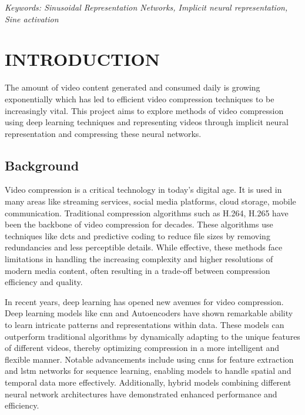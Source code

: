 \documentclass{ioereport}
\begin{document}
    \textit{Keywords: Sinusoidal Representation Networks, Implicit neural representation, Sine activation}

    \pagebreak
    
    \tableofcontents
    \pagebreak
    
    \listoffigures
    \pagebreak
    
    \listoftables
    \pagebreak

    \doublespacing
    \printglossary[type=\acronymtype,style=acronyms-only,title=List of Abbreviations{\vspace{0.15\baselineskip}}]
    \onehalfspacing


\mainsection

\section{\MakeUppercase{Introduction}}
The amount of video content generated and consumed daily is growing exponentially \cite{biteable2021} which has led to efficient video compression techniques to be increasingly vital. This project aims to explore methods of video compression using deep learning techniques and representing videos through implicit neural representation and compressing these neural networks.
    
    \subsection{Background}
    Video compression is a critical technology in today’s digital age. It is used in many areas like streaming services, social media platforms, cloud storage, mobile communication. Traditional compression algorithms such as H.264, H.265 have been the backbone of video compression for decades. These algorithms use techniques like \gls{dct}s and predictive coding to reduce file sizes by removing redundancies and less perceptible details. While effective, these methods face limitations in handling the increasing complexity and higher resolutions of modern media content, often resulting in a trade-off between compression efficiency and quality.

    In recent years, deep learning has opened new avenues for video compression. Deep learning models like \gls{cnn} and Autoencoders have shown remarkable ability to learn intricate patterns and representations within data. These models can outperform traditional algorithms by dynamically adapting to the unique features of different videos, thereby optimizing compression in a more intelligent and flexible manner. Notable advancements include using \gls{cnn}s for feature extraction and \gls{lstm} networks for sequence learning, enabling models to handle spatial and temporal data more effectively. Additionally, hybrid models combining different neural network architectures have demonstrated enhanced performance and efficiency. 
    
\end{document}
